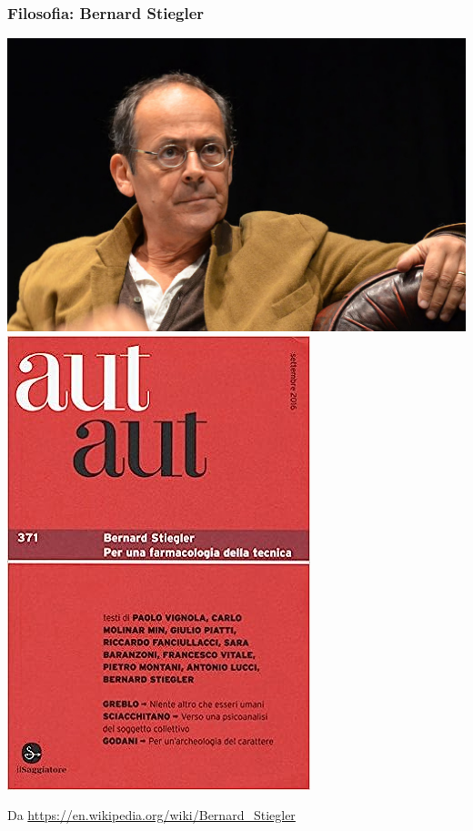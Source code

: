 \documentclass[xcolor=svgnames]{beamer}
\begin{document}
\begin{frame}\small\frametitle{Filosofia: Bernard Stiegler}

  \includegraphics[height=.5\textheight]{pictures/stiegler.jpg} \hfill   \includegraphics[height=.5\textheight]{pictures/autaut.jpg}

  {\tiny Da \url{https://en.wikipedia.org/wiki/Bernard_Stiegler}}


\end{frame}
\end{document}
